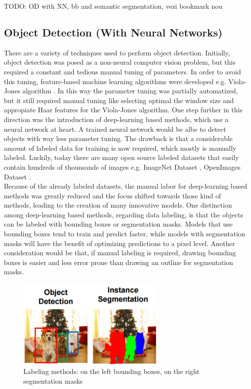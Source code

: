 TODO: OD with NN, bb and semantic segmentation, vezi bookmark nou
\subsection{Object Detection (With Neural Networks)}
There are a variety of techniques used to perform object detection. Initially, object detection was posed as a non-neural computer vision problem, but this required a constant and tedious manual tuning of parameters. In order to avoid this tuning, feature-based machine learning algorithms were developed e.g. Viola-Jones algorithm \cite{viola_joines_paper}. In this way the parameter tuning was partially automatized, but it still required manual tuning like selecting optimal the window size and appropiate Haar features for the Viola-Jones algorithm.
One step further in this direction was the introduction of deep-learning based methods, which use a neural network at heart. A trained neural network would be albe to detect objects with way less parameter tuning. The drawback is that a considerable amount of labeled data for training is now required, which mostly is manually labeled. Luckily, today there are many open source labeled datasets that easily contain hundreds of thounsands of images e.g. ImageNet Dataset \cite{imagenet_site}, OpenImages Dataset \cite{openimages_site}. \\
Because of the already labeled datasets, the manual labor for deep-learning based methods was greatly reduced and the focus shifted towards those kind of methods, leading to the creation of many innovative models. One distinction among deep-learning based methods, regarding data labeling, is that the objects can be labeled with bounding boxes or segmentation masks. Models that use bounding boxes tend to train and predict faster, while models with segmentation masks will have the benefit of optimizing predictions to a pixel level. Another consideration would be that, if manual labeling is required, drawing bounding boxes is easier and less error prone than drawing an outline for segmentation masks. \\

\begin{figure}[!h]
\centering
\includegraphics[width=0.65\textwidth]{images/bbs_vs_seg}
\caption{Labeling methods: on the left bounding boxes, on the right segmentation masks}
\end{figure}

